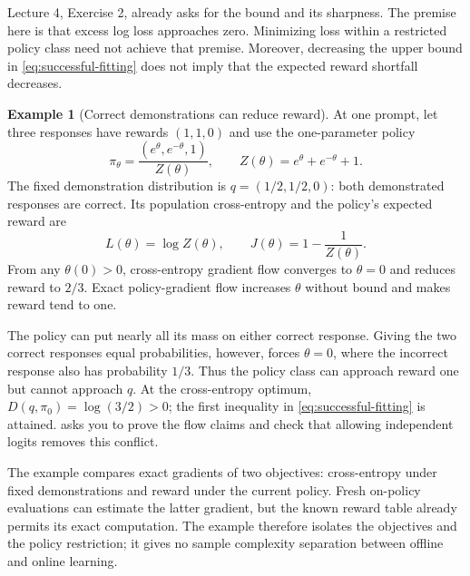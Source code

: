 \documentclass[11pt,twoside]{article}
\newcommand{\KL}{D}
\theoremstyle{definition}
\newtheorem{example}[theorem]{Example}
\theoremstyle{remark}
\begin{document}
Lecture 4, Exercise 2, already asks for the bound and its sharpness.
The premise here is that excess log loss approaches zero. Minimizing loss
within a restricted policy class need not achieve that premise. Moreover,
decreasing the upper bound in \cref{eq:successful-fitting} does not imply
that the expected reward shortfall decreases.

\begin{example}[Correct demonstrations can reduce reward]
\label{ex:successful-compromise}
At one prompt, let three responses have rewards $(1,1,0)$ and use
the one-parameter policy
\[
 \pi_\theta=\frac{(e^\theta,e^{-\theta},1)}{Z(\theta)},\qquad
 Z(\theta)=e^\theta+e^{-\theta}+1.
\]
The fixed demonstration distribution is $q=(1/2,1/2,0)$: both demonstrated
responses are correct. Its population cross-entropy and the policy's
expected reward are
\[
 L(\theta)=\log Z(\theta),\qquad J(\theta)=1-\frac1{Z(\theta)}.
\]
From any $\theta(0)>0$, cross-entropy gradient flow converges to
$\theta=0$ and reduces reward to $2/3$. Exact policy-gradient flow increases
$\theta$ without bound and makes reward tend to one.
\end{example}

The policy can put nearly all its mass on either correct response.
Giving the two correct responses equal probabilities, however, forces
$\theta=0$, where the incorrect response also has probability $1/3$.
Thus the policy class can approach reward one but cannot approach $q$.
At the cross-entropy optimum,
$\KL(q,\pi_0)=\log(3/2)>0$; the first inequality in
\cref{eq:successful-fitting} is attained.
 asks you to prove the flow claims and
check that allowing independent logits removes this conflict.

The example compares exact gradients of two objectives: cross-entropy
under fixed demonstrations and reward under the current policy.
Fresh on-policy evaluations can estimate the latter gradient, but the known
reward table already permits its exact computation. The example therefore
isolates the objectives and the policy restriction; it gives no sample
complexity separation between offline and online learning.
\end{document}
